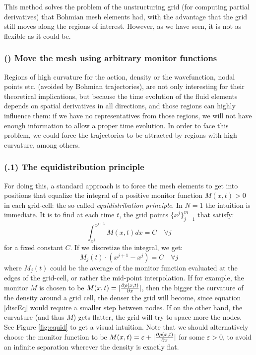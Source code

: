 \documentclass[11pt, a4paper]{article} %
\begin{document}
This method solves the problem of the unstructuring grid (for computing partial derivatives) that Bohmian mesh elements had, with the advantage that the grid still moves along the regions of interest. However, as we have seen, it is not as flexible as it could be.

\subsubsection*{\bf (\textgamma) Move the mesh using arbitrary monitor functions } 
Regions of high curvature for the action, density or the wavefunction, nodal points etc. (avoided by Bohmian trajectories), are not only interesting for their theoretical implications, but because the time evolution of the fluid elements depends on spatial derivatives in all directions, and those regions can highly influence them: if we have no representatives from those regions, we will not have enough information to allow a proper time evolution. In order to face this problem, we could force the trajectories to be attracted by regions with high curvature, among others.

\subsubsection*{(\textgamma.1) The equidistribution principle}
For doing this, a standard approach is to force the mesh elements to get into positions that equalize the integral of a positive monitor function $M(x,t)>0$ in each grid-cell: the so called {\em equidistribution principle}. In $N=1$ the intuition is immediate. It is to find at each time $t$, the grid points $\{x^j\}_{j=1}^m$ that satisfy:
\begin{equation}
\int^{x^{j+1}}_{x^j} M(x,t) dx =C \quad \forall j
\end{equation}
for a fixed constant $C$. If we discretize the integral, we get:
\begin{equation}\label{discEq}
M_j(t)\cdot (x^{j+1}-x^j)=C \quad \forall j
\end{equation}
where $M_j(t)$ could be the average of the monitor function evaluated at the edges of the grid-cell, or rather the mid-point interpolation. If for example, the monitor $M$ is chosen to be $M(x,t)=|\pdv{\rho(x,t)}{x}|$, then the bigger the curvature of the density around a grid cell, the denser the grid will become, since equation \eqref{discEq} would require a smaller step between nodes. If on the other hand, the curvature (and thus $M$) gets flatter, the grid will try to space more the nodes. See Figure \ref{fig:equid} to get a visual intuition. Note that we should alternatively choose the monitor function to be $M(x,t)=\varepsilon+|\pdv{\rho(x,t)}{x}|$ for some $\varepsilon>0$, to avoid an infinite separation wherever the density is exactly flat. 
\end{document}
